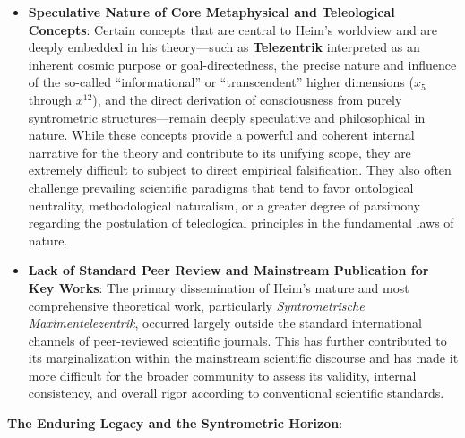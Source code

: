 \documentclass[12pt]{article}
\newcommand{\q}[1]{\enquote{#1}}
\begin{document}
\begin{itemize}
    \item \textbf{Speculative Nature of Core Metaphysical and Teleological Concepts}: Certain concepts that are central to Heim's worldview and are deeply embedded in his theory—such as \textbf{Telezentrik} interpreted as an inherent cosmic purpose or goal-directedness, the precise nature and influence of the so-called \enquote{informational} or \q{transcendent} higher dimensions (\(x_5\) through \(x^{12}\)), and the direct derivation of consciousness from purely syntrometric structures—remain deeply speculative and philosophical in nature. While these concepts provide a powerful and coherent internal narrative for the theory and contribute to its unifying scope, they are extremely difficult to subject to direct empirical falsification. They also often challenge prevailing scientific paradigms that tend to favor ontological neutrality, methodological naturalism, or a greater degree of parsimony regarding the postulation of teleological principles in the fundamental laws of nature.
    \item \textbf{Lack of Standard Peer Review and Mainstream Publication for Key Works}: The primary dissemination of Heim's mature and most comprehensive theoretical work, particularly \textit{Syntrometrische Maximentelezentrik}, occurred largely outside the standard international channels of peer-reviewed scientific journals. This has further contributed to its marginalization within the mainstream scientific discourse and has made it more difficult for the broader community to assess its validity, internal consistency, and overall rigor according to conventional scientific standards.
\end{itemize}

\textbf{The Enduring Legacy and the Syntrometric Horizon}:
\end{document}
